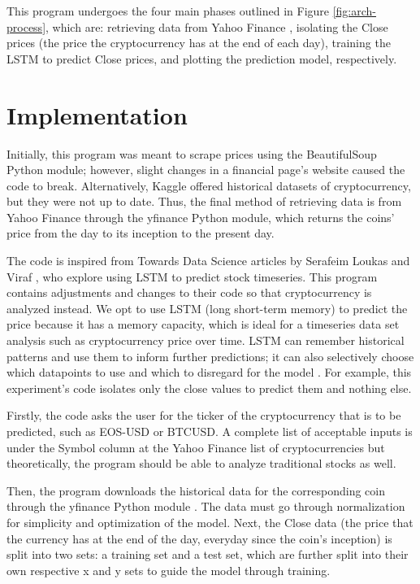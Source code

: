 This program undergoes the four main phases outlined in Figure \ref{fig:arch-process}, which are: retrieving data from Yahoo Finance \cite{c4}, isolating the Close prices (the price the cryptocurrency has at the end of each day), training the LSTM to predict Close prices, and plotting the prediction model, respectively.

\section{Implementation}

Initially, this program was meant to scrape prices using the BeautifulSoup Python module; however, slight changes in a financial page's website caused the code to break. Alternatively, Kaggle offered historical datasets of cryptocurrency, but they were not up to date. Thus, the final method of retrieving data is from Yahoo Finance through the yfinance Python module, which returns the coins' price from the day to its inception to the present day.

The code is inspired from Towards Data Science articles by Serafeim Loukas \cite{c7} and Viraf \cite{c11}, who explore using LSTM to predict stock timeseries. This program contains adjustments and changes to their code so that cryptocurrency is analyzed instead. We opt to use LSTM (long short-term memory) to predict the price because it has a memory capacity, which is ideal for a timeseries data set analysis such as cryptocurrency price over time. LSTM can remember historical patterns and use them to inform further predictions; it can also selectively choose which datapoints to use and which to disregard for the model \cite{c8}. For example, this experiment's code isolates only the close values to predict them and nothing else.

Firstly, the code asks the user for the ticker of the cryptocurrency that is to be predicted, such as EOS-USD or BTCUSD. A complete list of acceptable inputs is under the Symbol column at the Yahoo Finance list of cryptocurrencies \cite{c17} but theoretically, the program should be able to analyze traditional stocks as well.

Then, the program downloads the historical data for the corresponding coin through the yfinance Python module \cite{c18}. The data must go through normalization for simplicity and optimization of the model. Next, the Close data (the price that the currency has at the end of the day, everyday since the coin's inception) is split into two sets: a training set and a test set, which are further split into their own respective x and y sets to guide the model through training. 

